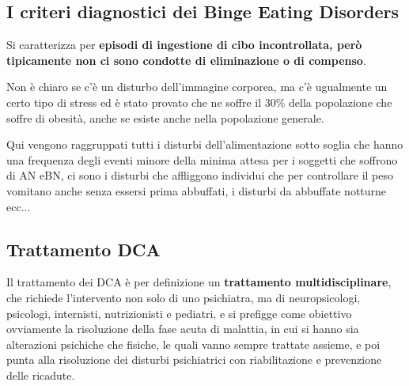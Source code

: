 \subsection{I criteri diagnostici dei Binge Eating Disorders}

Si caratterizza per \textbf{episodi di ingestione di cibo incontrollata,
però tipicamente non ci sono condotte di eliminazione o di compenso}.

Non è chiaro se c'è un disturbo dell'immagine corporea, ma c'è
ugualmente un certo tipo di stress ed è stato provato che ne soffre il
30\% della popolazione che soffre di obesità, anche se esiste anche
nella popolazione generale.

Qui vengono raggruppati tutti i disturbi dell'alimentazione sotto soglia
che hanno una frequenza degli eventi minore della minima attesa per i
soggetti che soffrono di AN eBN, ci sono i disturbi che affliggono
individui che per controllare il peso vomitano anche senza essersi prima
abbuffati, i disturbi da abbuffate notturne ecc...

\subsection{Trattamento DCA}

Il trattamento dei DCA è per definizione un \textbf{trattamento
multidisciplinare}, che richiede l'intervento non solo di uno
psichiatra, ma di neuropsicologi, psicologi, internisti, nutrizionisti e
pediatri, e si prefigge come obiettivo ovviamente la risoluzione della
fase acuta di malattia, in cui si hanno sia alterazioni psichiche che
fisiche, le quali vanno sempre trattate assieme, e poi punta alla
risoluzione dei disturbi psichiatrici con riabilitazione e prevenzione
delle ricadute.

